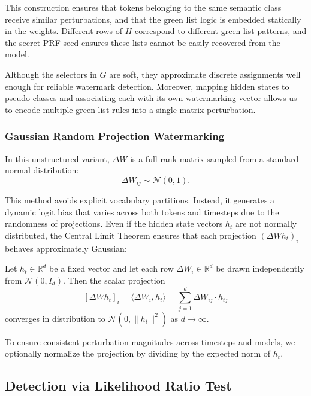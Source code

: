 This construction ensures that tokens belonging to the same semantic class receive similar perturbations, and that the green list logic is embedded statically in the weights. Different rows of \( H \) correspond to different green list patterns, and the secret PRF seed ensures these lists cannot be easily recovered from the model.

Although the selectors in \( G \) are soft, they approximate discrete assignments well enough for reliable watermark detection. Moreover, mapping hidden states to pseudo-classes and associating each with its own watermarking vector allows us to encode multiple green list rules into a single matrix perturbation.

\subsubsection*{Gaussian Random Projection Watermarking}

In this unstructured variant, \( \Delta W \) is a full-rank matrix sampled from a standard normal distribution:
\begin{equation}
    \Delta W_{ij} \sim \mathcal{N}(0, 1).
\end{equation}

This method avoids explicit vocabulary partitions. Instead, it generates a dynamic logit bias that varies across both tokens and timesteps due to the randomness of projections. Even if the hidden state vectors \( h_t \) are not normally distributed, the Central Limit Theorem ensures that each projection \( (\Delta W h_t)_i \) behaves approximately Gaussian:

\begin{theorem}
Let \( h_t \in \mathbb{R}^d \) be a fixed vector and let each row \( \Delta W_i \in \mathbb{R}^d \) be drawn independently from \( \mathcal{N}(0, I_d) \). Then the scalar projection
\[
[\Delta W h_t]_i = \langle \Delta W_i, h_t \rangle = \sum_{j=1}^d \Delta W_{ij} \cdot h_{tj}
\]
converges in distribution to \( \mathcal{N}(0, \|h_t\|^2) \) as \( d \to \infty \).
\end{theorem}

To ensure consistent perturbation magnitudes across timesteps and models, we optionally normalize the projection by dividing by the expected norm of \( h_t \).


\subsection{Detection via Likelihood Ratio Test}

